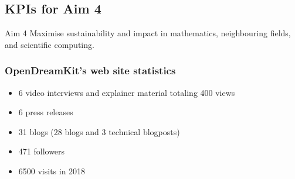 \begin{enumerate}
\end{enumerate}

\subsection{KPIs for Aim 4}

\begin{recommendation}{Aim 4}
  Maximise sustainability and impact in mathematics, neighbouring
  fields, and scientific computing.
\end{recommendation}

\subsubsection{OpenDreamKit's web site statistics}

\begin{itemize}
\item 6 video interviews and explainer material totaling 400 views
\item 6 press releases
\item 31 blogs (28 blogs and 3 technical blogposts)
\item 471 followers
\item 6500 visits in 2018
\end{itemize}

